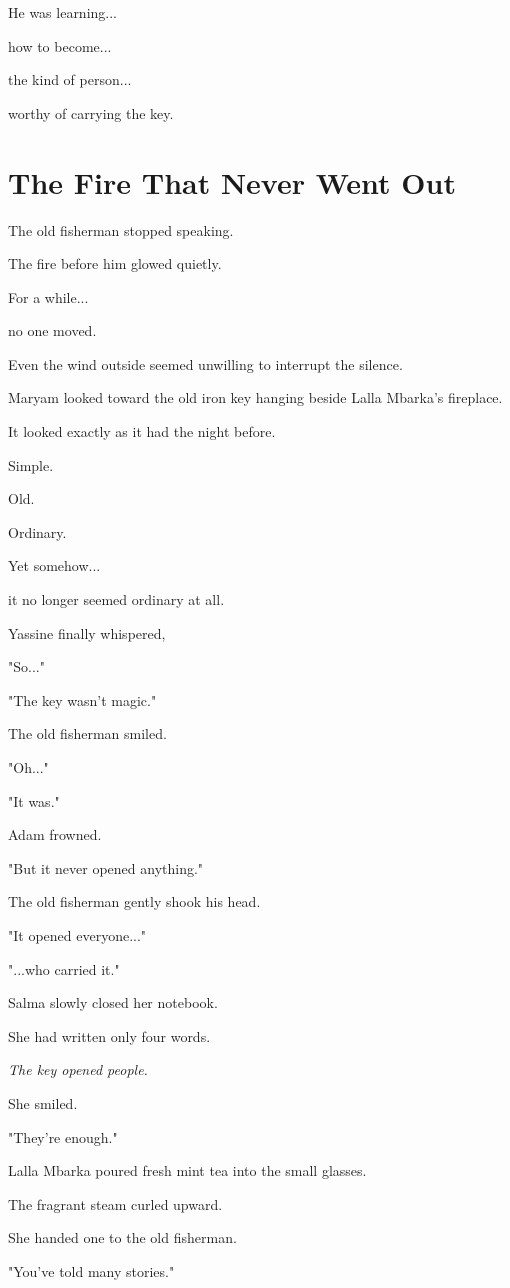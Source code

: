 \documentclass[12pt,openany]{book}
\begin{document}
He was learning...

how to become...

the kind of person...

worthy of carrying the key.
\section*{The Fire That Never Went Out}

The old fisherman stopped speaking.

The fire before him glowed quietly.

For a while...

no one moved.

Even the wind outside seemed unwilling to interrupt the silence.

Maryam looked toward the old iron key hanging beside Lalla Mbarka's fireplace.

It looked exactly as it had the night before.

Simple.

Old.

Ordinary.

Yet somehow...

it no longer seemed ordinary at all.

Yassine finally whispered,

"So..."

"The key wasn't magic."

The old fisherman smiled.

"Oh..."

"It was."

Adam frowned.

"But it never opened anything."

The old fisherman gently shook his head.

"It opened everyone..."

"...who carried it."

Salma slowly closed her notebook.

She had written only four words.

\emph{The key opened people.}

She smiled.

"They're enough."

Lalla Mbarka poured fresh mint tea into the small glasses.

The fragrant steam curled upward.

She handed one to the old fisherman.

"You've told many stories."
\end{document}
